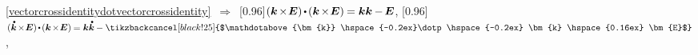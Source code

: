 \begin{otherlanguage}{russian}
\vspace{-0.4em} \noindent \eqref{vectorcrossidentitydotvectorcrossidentity} $\,\Rightarrow\,$
\scalebox{0.95}[0.96]{${( \bm{k} \hspace{-0.24ex}\times\hspace{-0.4ex} \bm{E} ) \hspace{-0.2ex} \dotp \hspace{-0.2ex} ( \bm{k} \hspace{-0.24ex}\times\hspace{-0.4ex} \bm{E} ) \hspace{-0.12ex} = \bm{k} \bm{k} \hspace{-0.1ex} - \hspace{-0.2ex} \bm{E}}$},\hspace{0.4ex}
%
\scalebox{0.95}[0.96]{${\displaystyle ( \mathdotabove{\bm{k}} \hspace{-0.24ex}\times\hspace{-0.4ex} \bm{E} ) \hspace{-0.2ex} \dotp \hspace{-0.2ex} ( \bm{k} \hspace{-0.24ex}\times\hspace{-0.4ex} \bm{E} ) \hspace{-0.12ex} = \bm{k} \mathdotabove{\bm{k}} \hspace{-0.1ex} - \tikzbackcancel[black!25]{$\mathdotabove{\bm{k}} \hspace{-0.2ex}\dotp\hspace{-0.2ex} \bm{k} \hspace{0.16ex} \bm{E}$}}$\hspace{0.16ex}},


\end{otherlanguage}
